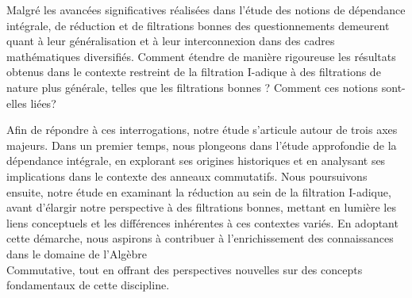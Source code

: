 Malgré les avancées significatives réalisées dans l'étude des notions de dépendance intégrale, de réduction et de filtrations bonnes des questionnements demeurent quant à leur généralisation et à leur interconnexion dans des cadres mathématiques diversifiés. Comment étendre de manière rigoureuse les résultats obtenus dans le contexte restreint de la filtration I-adique à des filtrations de nature plus générale, telles que les filtrations bonnes ? Comment ces notions sont-elles liées? 

Afin de répondre à ces interrogations, notre étude s'articule autour de trois axes majeurs. Dans un premier temps, nous plongeons dans l'étude approfondie de la dépendance intégrale, en explorant ses origines historiques et en analysant ses \\ implications dans le contexte des anneaux commutatifs. Nous poursuivons ensuite, notre étude en examinant la réduction au sein de la filtration I-adique, avant d'élargir notre perspective à des filtrations bonnes, mettant en lumière les liens conceptuels et les différences inhérentes à ces contextes variés. En adoptant cette démarche, nous aspirons à contribuer à l'enrichissement des connaissances dans le domaine de l'Algèbre \\ Commutative, tout en offrant des perspectives nouvelles sur des concepts fondamentaux de cette discipline.


